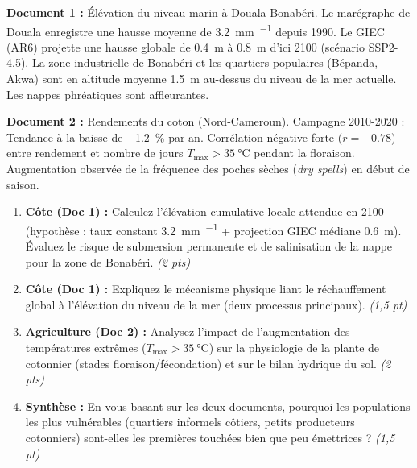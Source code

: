 \documentclass[11pt]{article}
\begin{document}
\begin{exercice}
\begin{minipage}[t]{0.58\linewidth}
\textbf{Document 1 :} Élévation du niveau marin à Douala-Bonabéri.  
Le marégraphe de Douala enregistre une hausse moyenne de \SI{3.2}{\milli\meter\per{}} depuis 1990. Le GIEC (AR6) projette une hausse globale de \SI{0.4}{\meter} à \SI{0.8}{\meter} d'ici 2100 (scénario SSP2-4.5). La zone industrielle de Bonabéri et les quartiers populaires (Bépanda, Akwa) sont en altitude moyenne \SI{1.5}{\meter} au-dessus du niveau de la mer actuelle. Les nappes phréatiques sont affleurantes.
\end{minipage}
\hfill
\begin{minipage}[t]{0.40\linewidth}
\textbf{Document 2 :} Rendements du coton (Nord-Cameroun).  
Campagne 2010-2020 : Tendance à la baisse de \SI{-1.2}{\percent} par an. Corrélation négative forte ($r = \num{-0.78}$) entre rendement et nombre de jours $T_{\max} > \SI{35}{\celsius}$ pendant la floraison. Augmentation observée de la fréquence des poches sèches (\textit{dry spells}) en début de saison.
\end{minipage}

\begin{enumerate}
    \item \textbf{Côte (Doc 1) :} Calculez l'élévation cumulative locale attendue en 2100 (hypothèse : taux constant \SI{3.2}{\milli\meter\per{}} + projection GIEC médiane \SI{0.6}{\meter}). Évaluez le risque de submersion permanente et de salinisation de la nappe pour la zone de Bonabéri. \textit{(2 pts)}
    \item \textbf{Côte (Doc 1) :} Expliquez le mécanisme physique liant le réchauffement global à l'élévation du niveau de la mer (deux processus principaux). \textit{(1,5 pt)}
    \item \textbf{Agriculture (Doc 2) :} Analysez l'impact de l'augmentation des températures extrêmes ($T_{\max} > \SI{35}{\celsius}$) sur la physiologie de la plante de cotonnier (stades floraison/fécondation) et sur le bilan hydrique du sol. \textit{(2 pts)}
    \item \textbf{Synthèse :} En vous basant sur les deux documents, pourquoi les populations les plus vulnérables (quartiers informels côtiers, petits producteurs cotonniers) sont-elles les premières touchées bien que peu émettrices ? \textit{(1,5 pt)}
\end{enumerate}
\end{exercice}
\end{document}
